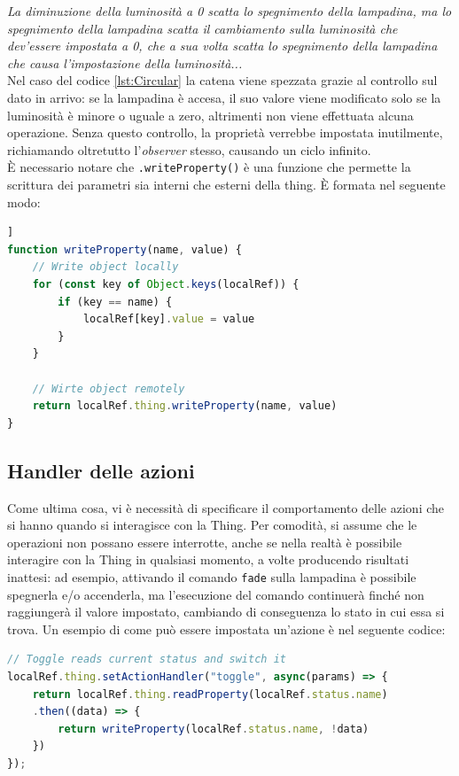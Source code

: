 \documentclass[12pt,a4paper,openright,oneside]{report}
\begin{document}
	\textit{La diminuzione della luminosità a 0 scatta lo spegnimento della lampadina, ma lo spegnimento della lampadina scatta il cambiamento sulla luminosità che dev'essere impostata a 0, che a sua volta scatta lo spegnimento della lampadina che causa l'impostazione della luminosità...}\\
	
Nel caso del codice \ref{lst:Circular} la catena viene spezzata grazie al controllo sul dato in arrivo: se la lampadina è accesa, il suo valore viene modificato solo se la luminosità è minore o uguale a zero, altrimenti non viene effettuata alcuna operazione. Senza questo controllo, la proprietà verrebbe impostata inutilmente, richiamando oltretutto l'\textit{observer} stesso, causando un ciclo infinito.\\ 
	
È necessario notare che \texttt{.writeProperty()} è una funzione che permette la scrittura dei parametri sia interni che esterni della thing. È formata nel seguente modo:

\begin{lstlisting}[language=JavaScript]]
function writeProperty(name, value) {
	// Write object locally
	for (const key of Object.keys(localRef)) {
		if (key == name) {
			localRef[key].value = value
		}
	}
	
	// Wirte object remotely
	return localRef.thing.writeProperty(name, value)
}
\end{lstlisting}


\subsection{Handler delle azioni}
Come ultima cosa, vi è necessità di specificare il comportamento delle azioni che si hanno quando si interagisce con la Thing. Per comodità, si assume che le operazioni non possano essere interrotte, anche se nella realtà è possibile interagire con la Thing in qualsiasi momento, a volte producendo risultati inattesi: ad esempio, attivando il comando \texttt{fade} sulla lampadina è possibile spegnerla e/o accenderla, ma l'esecuzione del comando continuerà finché non raggiungerà il valore impostato, cambiando di conseguenza lo stato in cui essa si trova. Un esempio di come può essere impostata un'azione è nel seguente codice:

\begin{lstlisting}[language=JavaScript,caption={Reagire all'invocazione dell'azione in \texttt{bulb.js}}]
// Toggle reads current status and switch it
localRef.thing.setActionHandler("toggle", async(params) => {
	return localRef.thing.readProperty(localRef.status.name)
	.then((data) => {
		return writeProperty(localRef.status.name, !data)
	})
});
\end{lstlisting}
\end{document}
